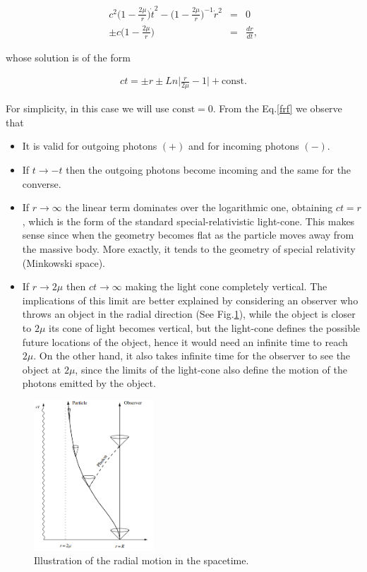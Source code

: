 \documentclass[letterpaper,11pt,onecolumn]{article}
\begin{document}
 \begin{eqnarray*}
       c^{2}\Big( 1- \frac{2\mu}{r}\Big) \dot{t}^{2}-\Big( 1-\frac{2\mu}{r}\Big)^{-1} \dot{r}^{2}&=&0\\
       \pm  c\Big( 1- \frac{2\mu}{r}\Big)&=&\frac{dr}{dt},
\end{eqnarray*}

whose solution is of the form

  \begin{eqnarray}
       ct=\pm r\pm Ln\Big| \frac{r}{2\mu}-1 \Big| + \text{const} \label{frf}.
 \end{eqnarray}
 
 For simplicity, in this case we will use $\text{const}=0$. From the Eq.\ref{frf} we observe that

\begin{itemize}
    \item It is valid for outgoing photons $(+)$ and for incoming photons $(-)$.
    \item If $t\rightarrow -t$ then the outgoing photons become incoming and the same for the converse.
    \item If $r \rightarrow \infty$ the linear term dominates over the logarithmic one, obtaining $ct=r$, which is the form of the standard special-relativistic light-cone. This makes sense since when the geometry becomes flat as the particle moves away from the massive body. More exactly, it tends to the geometry of special relativity (Minkowski space).
    \item If $r \rightarrow 2\mu$ then $ct\rightarrow \infty$ making the light cone completely vertical. The implications of this limit are better explained by considering an observer who throws an object in the radial direction (See Fig.\ref{radm}), while the object is closer to $2\mu$ its cone of light becomes vertical, but the light-cone defines the possible future locations of the object, hence it would need an infinite time to reach $2\mu$. On the other hand, it also takes infinite time for the observer to see the object at $2\mu$, since the limits of the light-cone also define the motion of the photons emitted by the object.
\end{itemize}

 \begin{figure}[h!]
    \centering
    \includegraphics[width=0.4\textwidth]{Report/Images/3_foton_radia.png}
    \caption{Illustration of the radial motion in the spacetime.}
\label{radm}
\end{figure}
\end{document}
